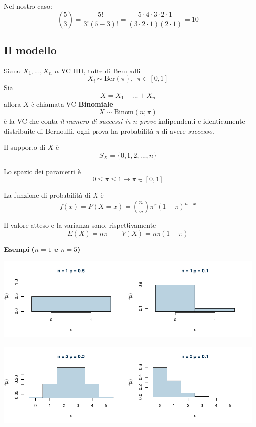\documentclass[
  11pt,
]{book}
\theoremstyle{mytheoremstyle}
\theoremstyle{mydefstyle}
\begin{document}
Nel nostro caso:
\[\binom{5}{ 3}=\frac{5!}{3!(5-3)!}=\frac{5\cdot 4 \cdot 3\cdot 2\cdot 1}{(3\cdot 2\cdot 1)(2\cdot 1)}=10\]

\subsection{Il modello}\label{il-modello}

Siano \(X_1,...,X_n\) \(n\) VC IID, tutte di Bernoulli
\[
X_i\sim\text{Ber}(\pi), ~~\pi\in{[0,1]}
\]
Sia
\[
X=X_1+...+X_n
\]
allora \(X\) è chiamata VC \textbf{Binomiale}
\[X\sim\text{Binom}(n;\pi)
\]
è la VC che conta \emph{il numero di successi in \(n\) prove} indipendenti e identicamente distribuite di Bernoulli, ogni prova ha probabilità \(\pi\) di avere \emph{successo}.

Il supporto di \(X\) è
\[S_X=\{0,1,2,...,n\}\]

Lo spazio dei parametri è
\[0\leq\pi\leq 1 \rightarrow \pi\in[0,1]\]

La funzione di probabilità di \(X\) è
\[f(x)=P(X=x)=\binom{n}{ x}\pi^x(1-\pi)^{n-x} \]

Il valore atteso e la varianza sono, rispettivamente
\[E(X)=n\pi\qquad V(X)=n\pi(1-\pi)\]

\textbf{Esempi (\(n=1\) e \(n=5\))}

\begin{center}\includegraphics{Appunti_di_Statistica_2025_files/figure-latex/07a-Binomiale-1,-1} \end{center}

\begin{center}\includegraphics{Appunti_di_Statistica_2025_files/figure-latex/07a-Binomiale-2,-1} \end{center}
\end{document}
